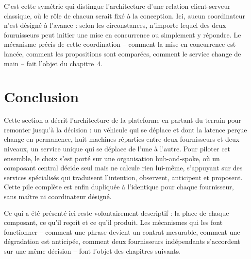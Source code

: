 C'est cette symétrie qui distingue l'architecture d'une relation client-serveur classique, où le rôle de chacun serait fixé à la conception. Ici, aucun coordinateur n'est désigné à l'avance : selon les circonstances, n'importe lequel des deux fournisseurs peut initier une mise en concurrence ou simplement y répondre. Le mécanisme précis de cette coordination -- comment la mise en concurrence est lancée, comment les propositions sont comparées, comment le service change de main -- fait l'objet du chapitre~4.
\section{Conclusion}
Cette section a décrit l'architecture de la plateforme en partant du terrain pour remonter jusqu'à la décision : un véhicule qui se déplace et dont la latence perçue change en permanence, huit machines réparties entre deux fournisseurs et deux niveaux, un service unique qui se déplace de l'une à l'autre. Pour piloter cet ensemble, le choix s'est porté sur une organisation hub-and-spoke, où un composant central décide seul mais ne calcule rien lui-même, s'appuyant sur des services spécialisés qui traduisent l'intention, observent, anticipent et proposent. Cette pile complète est enfin dupliquée à l'identique pour chaque fournisseur, sans maître ni coordinateur désigné.

Ce qui a été présenté ici reste volontairement descriptif : la place de chaque composant, ce qu'il reçoit et ce qu'il produit. Les mécanismes qui les font fonctionner -- comment une phrase devient un contrat mesurable, comment une dégradation est anticipée, comment deux fournisseurs indépendants s'accordent sur une même décision -- font l'objet des chapitres suivants.
